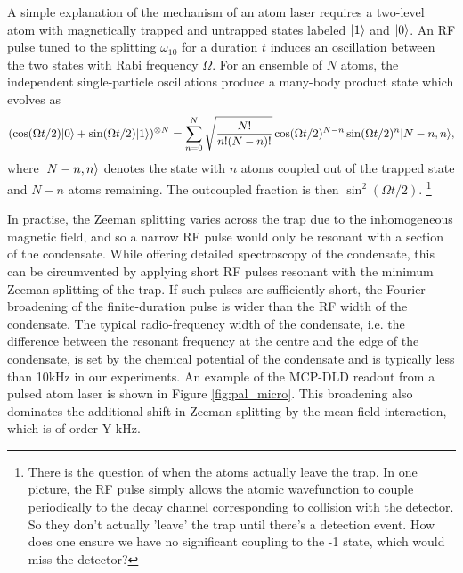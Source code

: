 	A simple explanation of the mechanism of an atom laser requires a two-level atom with magnetically trapped and untrapped states labeled $|1\rangle$ and $|0\rangle$.
	An RF pulse tuned to the splitting $\omega_{10}$ for a duration $t$  induces an oscillation between the two states with Rabi frequency $\Omega$.
	For an ensemble of $N$ atoms, the independent single-particle oscillations produce a many-body product state which evolves as \cite{mewes97}
	\begin{equation}
		(\cos(\Omega t/2)|0\rangle + \sin(\Omega t/2)|1\rangle)^{\otimes N} = \sum_{n=0}^{ N}\sqrt{\frac{N!}{n!(N-n)!}}\cos(\Omega t/2)^{N-n}\sin(\Omega t/2)^n|N-n,n\rangle,
	\end{equation}
	where $|N-n,n\rangle$ denotes the state with $n$ atoms coupled out of the trapped state and $N-n$ atoms remaining.
	The outcoupled fraction is then $\sin^2(\Omega t/2)$.
	\footnote{There is the question of when the atoms actually leave the trap.
	In one picture, the RF pulse simply allows the atomic wavefunction to couple periodically to the decay channel corresponding to collision with the detector.
	So they don't actually 'leave' the trap until there's a detection event.
	How does one ensure we have no significant coupling to the -1 state, which would miss the detector?}

	In practise, the Zeeman splitting varies across the trap due to the inhomogeneous magnetic field, and so a narrow RF pulse would only be resonant with a section of the condensate.
	While offering detailed spectroscopy of the condensate, this can be circumvented by applying short RF pulses resonant with the minimum Zeeman splitting of the trap.
	If such pulses are sufficiently short, the Fourier broadening of the finite-duration pulse is wider than the RF width of the condensate.
	The typical radio-frequency width of the condensate, i.e.
	the difference between the resonant frequency at the centre and the edge of the condensate, is set by the chemical potential of the condensate and is typically less than 10kHz in our experiments.
	An example of the MCP-DLD readout from a pulsed atom laser is shown in Figure \ref{fig:pal_micro}.
	This broadening also dominates the additional shift in Zeeman splitting by the mean-field interaction, which is of order Y kHz.
	
